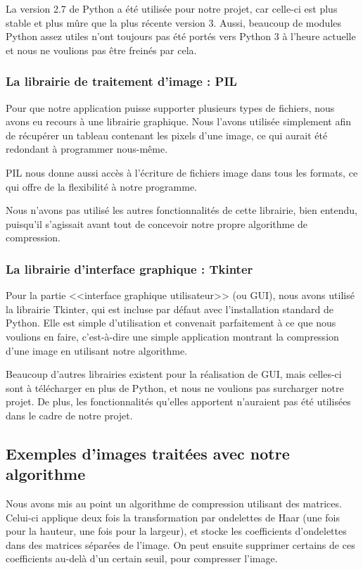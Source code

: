 \documentclass{article}
\begin{document}
La version 2.7 de Python a été utilisée pour notre projet, car celle-ci est plus stable et plus mûre que la plus récente version 3. Aussi, beaucoup de modules Python assez utiles n'ont toujours pas été portés vers Python 3 à l'heure actuelle et nous ne voulions pas être freinés par cela. 

\subsubsection{La librairie de traitement d'image : PIL}

Pour que notre application puisse supporter plusieurs types de fichiers, nous avons eu recours à une librairie graphique. Nous l'avons utilisée simplement afin de récupérer un tableau contenant les pixels d'une image, ce qui aurait été redondant à programmer nous-même.

PIL nous donne aussi accès à l'écriture de fichiers image dans tous les formats, ce qui offre de la flexibilité à notre programme.

Nous n'avons pas utilisé les autres fonctionnalités de cette librairie, bien entendu, puisqu'il s'agissait avant tout de concevoir notre propre algorithme de compression.

\subsubsection{La librairie d'interface graphique : Tkinter}

Pour la partie <<interface graphique utilisateur>> (ou GUI), nous avons utilisé la librairie Tkinter, qui est incluse par défaut avec l'installation standard de Python. Elle est simple d'utilisation et convenait parfaitement à ce que nous voulions en faire, c'est-à-dire une simple application montrant la compression d'une image en utilisant notre algorithme.

Beaucoup d'autres librairies existent pour la réalisation de GUI, mais celles-ci sont à télécharger en plus de Python, et nous ne voulions pas surcharger notre projet. De plus, les fonctionnalités qu'elles apportent n'auraient pas été utilisées dans le cadre de notre projet.


\subsection{Exemples d'images traitées avec notre algorithme}

Nous avons mis au point un algorithme de compression utilisant des matrices. Celui-ci applique deux fois la transformation par ondelettes de Haar (une fois pour la hauteur, une fois pour la largeur), et stocke les coefficients d'ondelettes dans des matrices séparées de l'image. On peut ensuite supprimer certains de ces coefficients au-delà d'un certain seuil, pour compresser l'image.
\end{document}
